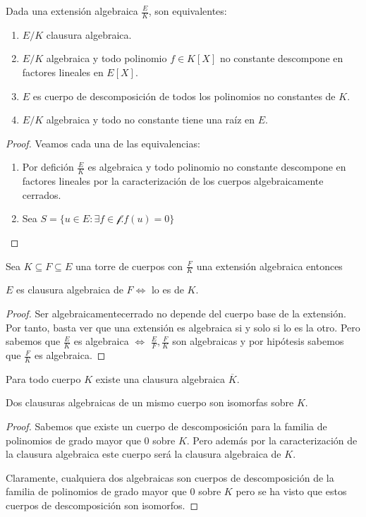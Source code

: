 \begin{proposition}
Dada una extensión algebraica $\frac{E}{K}$, son equivalentes:

\begin{enumerate}
\item $E/K$ clausura algebraica.
\item $E/K$ algebraica y todo polinomio $f \in K[X]$ no constante  descompone en factores lineales en $E[X]$.
\item $E$ es cuerpo de descomposición de todos los polinomios no constantes de $K$.
\item $E/K$ algebraica y todo no constante tiene una raíz en $E$.
\end{enumerate}
\end{proposition}
\begin{proof}
Veamos cada una de las equivalencias:

\begin{enumerate}
\item Por defición $\frac{E}{K}$ es algebraica y todo polinomio no constante descompone en factores lineales por la caracterización de los cuerpos algebraicamente cerrados. 
\item Sea $S = \{u \in E:\exists f \in \mathcal{f}. f(u) = 0\}$
\end{enumerate}
\end{proof}

\begin{proposition}
Sea $K \subseteq F \subseteq E$ una torre de cuerpos con $\frac{F}{K}$ una extensión algebraica entonces 

$E$ es clausura algebraica de $F \iff$ lo es de $K$. 
\end{proposition}
\begin{proof}
Ser algebraicamentecerrado no depende del cuerpo base de la extensión. Por tanto, basta ver que una extensión es algebraica si y solo si lo es la otro. Pero sabemos que $\frac{E}{K}$ es algebraica $\iff$ $\frac{E}{F},\frac{F}{K}$ son algebraicas y por hipótesis sabemos que $\frac{F}{K}$ es algebraica. 
\end{proof}

\begin{theorem}
	Para todo cuerpo $K$ existe una clausura algebraica $\overline{K}$. 
	
	Dos clausuras algebraicas de un mismo cuerpo son isomorfas sobre $K$. 
\end{theorem}
\begin{proof}
Sabemos que existe un cuerpo de descomposición para la familia de polinomios de grado mayor que 0 sobre $K$. Pero además por la caracterización de la clausura algebraica este cuerpo será la clausura algebraica de $K$.

Claramente, cualquiera dos algebraicas son cuerpos de descomposición de la familia de polinomios de grado mayor que 0 sobre $K$ pero se ha visto que estos cuerpos de descomposición son isomorfos. 
\end{proof}

